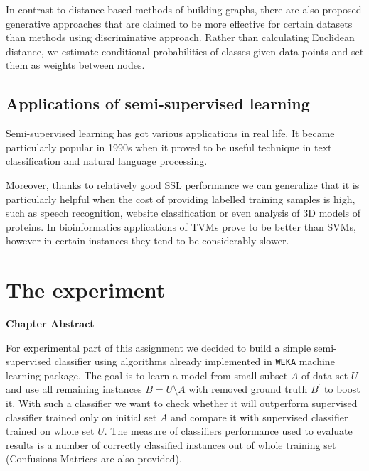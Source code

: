 \documentclass[12pt, a4paper, pdflatex]{report}
\newenvironment{chapabstract}
{
	\vspace{0.5cm}
	\small
	\begin{center}
    \bfseries Chapter Abstract
    \end{center}
}{\vspace{1.5cm}}
\begin{document}
In contrast to distance based methods of building graphs, there are also proposed generative approaches that are claimed to be more effective for certain datasets than methods using discriminative approach\cite{He07}. Rather than calculating Euclidean distance, we estimate conditional probabilities of classes given data points and set them as weights between nodes. 

\section{Applications of semi-supervised learning}
Semi-supervised learning has got various applications in real life. It became particularly popular in 1990s when it proved to be useful technique in text classification and natural language processing\cite{chapelle06}. 

Moreover, thanks to relatively good SSL performance we can generalize that it is particularly helpful when the cost of providing labelled training samples is high, such as speech recognition, website classification or even analysis of 3D models of proteins. In bioinformatics applications of TVMs prove to be better than SVMs, however in certain instances they tend to be considerably slower\cite{chapelle06}.







\chapter{The experiment}

\begin{chapabstract}
For experimental part of this assignment we decided to build a simple semi-supervised classifier using algorithms already implemented in \texttt{WEKA} machine learning package. The goal is to learn a model from small subset $A$ of data set $U$ and use all remaining instances $B = U \setminus A$ with removed ground truth $B^{\prime}$ to boost it. With such a classifier we want to check whether it will outperform supervised classifier trained only on initial set $A$ and compare it with supervised classifier trained on whole set $U$. The measure of classifiers performance used to evaluate results is a number of correctly classified instances out of whole training set (Confusions Matrices are also provided).
\end{chapabstract}
\end{document}
